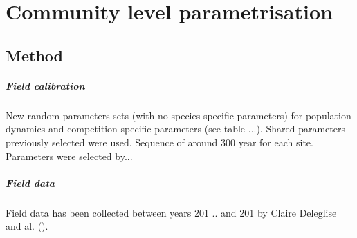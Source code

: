 
%
%

\chapter{Community level parametrisation}

\section{Method}

\paragraph{Field calibration}
New random parameters sets (with no species specific parameters) for population dynamics and competition specific parameters (see table ...). Shared parameters previously selected were used.
Sequence of around 300 year for each site. Parameters were selected by...


\paragraph{Field data}
Field data has been collected between years 201 .. and 201 by Claire Deleglise and al. ().


